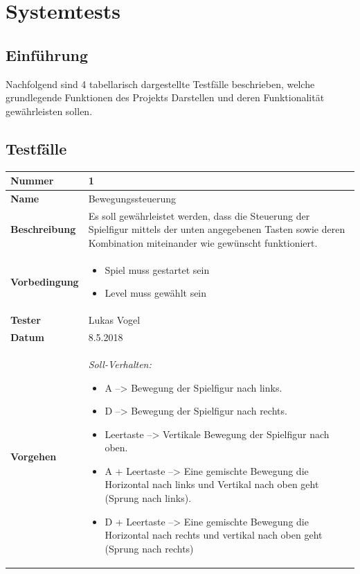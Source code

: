 \section{Systemtests} 
\subsection{Einführung}
Nachfolgend sind 4 tabellarisch dargestellte Testfälle beschrieben, welche grundlegende Funktionen des Projekts Darstellen und deren Funktionalität gewährleisten sollen.

\subsection{Testfälle}
\begin{table}
	
\renewcommand{\arraystretch}{1.5}
\begin{tabular}{|p{3.5cm}|p{11cm}|}
	
	\hline 
	\textbf{Nummer} & 1 \\ 
	\hline 
	\textbf{Name} & {\large Bewegungssteuerung} \\ 
	\hline 
	\textbf{Beschreibung} & 
	Es soll gewährleistet werden, dass die Steuerung der Spielfigur mittels der unten angegebenen Tasten sowie deren Kombination miteinander wie gewünscht funktioniert.  \\ 
	\hline 
	\textbf{Vorbedingung} & 
	\begin{itemize}
		\setlength{\itemsep}{1pt}
		\setlength{\parskip}{0.5pt}
		\item Spiel muss gestartet sein
		\item Level muss gewählt sein
	\end{itemize} \\ 
	\hline 
	\textbf{Tester} & Lukas Vogel \\ 
	\hline 
	\textbf{Datum} & 8.5.2018 \\ 
	\hline 
	\textbf{Vorgehen} & 
	\textit{Soll-Verhalten:}
	\begin{itemize}
		\setlength{\itemsep}{1pt}
		\setlength{\parskip}{0.5pt}
		\item A --> Bewegung der Spielfigur nach links.
		\item D --> Bewegung der Spielfigur nach rechts.
		\item Leertaste --> Vertikale Bewegung der Spielfigur nach oben.
		\item A + Leertaste --> Eine gemischte Bewegung die Horizontal nach links und Vertikal nach oben geht (Sprung nach links).
		\item D + Leertaste --> Eine gemischte Bewegung die Horizontal nach rechts und vertikal nach oben geht (Sprung nach rechts) \newline
	\end{itemize}  
	

\end{tabular}
\end{table}

